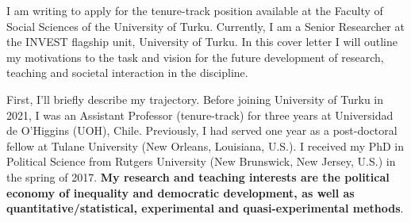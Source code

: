 \documentclass[10pt,stdletter,dateno,sigleft]{newlfm} %
\begin{document}
\begin{newlfm}


\vspace{-0.3cm}I am writing to apply for the tenure-track position available at the Faculty of Social Sciences of the University of Turku. Currently, I am a Senior Researcher at the INVEST flagship unit, University of Turku. In this cover letter I will outline my motivations to the task and vision for the future development of research, teaching and societal interaction in the discipline.

First, I'll briefly describe my trajectory. Before joining University of Turku in 2021, I was an Assistant Professor (tenure-track) for three years at Universidad de O'Higgins (UOH), Chile. Previously, I had served one year as a post-doctoral fellow at Tulane University (New Orleans, Louisiana, U.S.). I received my PhD in Political Science from Rutgers University (New Brunswick, New Jersey, U.S.) in the spring of 2017. {\bf My research and teaching interests are the political economy of inequality and democratic development, as well as quantitative/statistical, experimental and quasi-experimental methods}. 






\end{newlfm}
\end{document}
